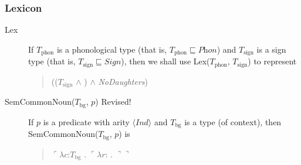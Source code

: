 \subsubsection{Lexicon} 
\begin{description}
\item[\textnormal{Lex}] \mbox{}

  If $T_{\mathrm{phon}}$ is a phonological type (that is,
$T_{\mathrm{phon}}\sqsubseteq\textit{Phon}$) and $T_{\mathrm{sign}}$
is a sign type (that is, $T_{\mathrm{sign}}\sqsubseteq\textit{Sign}$), then we shall use
Lex($T_{\mathrm{phon}}$, $T_{\mathrm{sign}}$) to represent
\begin{quote}
(($T_{\mathrm{sign}}$ \d{$\wedge$}
)
\d{$\wedge$} \textit{NoDaughters})
\end{quote}





\item[\textnormal{SemCommonNoun($T_{\mathrm{bg}}$, $p$)} Revised!]
  \mbox{}

    If $p$ is a predicate with arity $\langle\textit{Ind}\rangle$ and
    $T_{\mathrm{bg}}$ is a type (of context), then
    SemCommonNoun($T_{\mathrm{bg}}$, $p$) is
  \begin{quote}
    $\ulcorner\lambda c$:$T_{\mathrm{bg}}$ . $\ulcorner\lambda
r$:
. $\urcorner\urcorner$
\end{quote}


\end{description}
